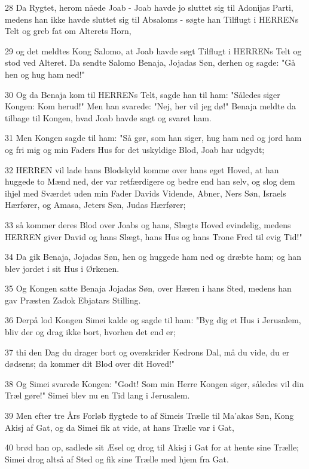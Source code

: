 \par 28 Da Rygtet, herom nåede Joab - Joab havde jo sluttet sig til Adonijas Parti, medens han ikke havde sluttet sig til Absaloms - søgte han Tilflugt i HERRENs Telt og greb fat om Alterets Horn,
\par 29 og det meldtes Kong Salomo, at Joab havde søgt Tilflugt i HERRENs Telt og stod ved Alteret. Da sendte Salomo Benaja, Jojadas Søn, derhen og sagde: "Gå hen og hug ham ned!"
\par 30 Og da Benaja kom til HERRENs Telt, sagde han til ham: "Således siger Kongen: Kom herud!" Men han svarede: "Nej, her vil jeg dø!" Benaja meldte da tilbage til Kongen, hvad Joab havde sagt og svaret ham.
\par 31 Men Kongen sagde til ham: "Så gør, som han siger, hug ham ned og jord ham og fri mig og min Faders Hus for det uskyldige Blod, Joab har udgydt;
\par 32 HERREN vil lade hans Blodskyld komme over hans eget Hoved, at han huggede to Mænd ned, der var retfærdigere og bedre end han selv, og slog dem ihjel med Sværdet uden min Fader Davids Vidende, Abner, Ners Søn, Israels Hærfører, og Amasa, Jeters Søn, Judas Hærfører;
\par 33 så kommer deres Blod over Joabs og hans, Slægts Hoved evindelig, medens HERREN giver David og hans Slægt, hans Hus og hans Trone Fred til evig Tid!"
\par 34 Da gik Benaja, Jojadas Søn, hen og huggede ham ned og dræbte ham; og han blev jordet i sit Hus i Ørkenen.
\par 35 Og Kongen satte Benaja Jojadas Søn, over Hæren i hans Sted, medens han gav Præsten Zadok Ebjatars Stilling.
\par 36 Derpå lod Kongen Simei kalde og sagde til ham: "Byg dig et Hus i Jerusalem, bliv der og drag ikke bort, hvorhen det end er;
\par 37 thi den Dag du drager bort og overskrider Kedrons Dal, må du vide, du er dødsens; da kommer dit Blod over dit Hoved!"
\par 38 Og Simei svarede Kongen: "Godt! Som min Herre Kongen siger, således vil din Træl gøre!" Simei blev nu en Tid lang i Jerusalem.
\par 39 Men efter tre Års Forløb flygtede to af Simeis Trælle til Ma'akas Søn, Kong Akisj af Gat, og da Simei fik at vide, at hans Trælle var i Gat,
\par 40 brød han op, sadlede sit Æsel og drog til Akisj i Gat for at hente sine Trælle; Simei drog altså af Sted og fik sine Trælle med hjem fra Gat.
